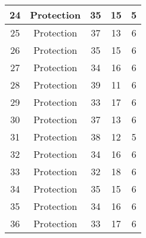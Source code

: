 \documentclass[results.tex]{subfiles}
\begin{document}
\begin{center}
\begin{tabular}{| c || c | c | c | c |}
            \hline
            24                      & Protection                   & 35                     & 15                      & 5                    \\
            \hline
            25                      & Protection                   & 37                     & 13                      & 6                    \\
            \hline
            26                      & Protection                   & 35                     & 15                      & 6                    \\
            \hline
            27                      & Protection                   & 34                     & 16                      & 6                    \\
            \hline
            28                      & Protection                   & 39                     & 11                      & 6                    \\
            \hline
            29                      & Protection                   & 33                     & 17                      & 6                    \\
            \hline
            30                      & Protection                   & 37                     & 13                      & 6                    \\
            \hline
            31                      & Protection                   & 38                     & 12                      & 5                    \\
            \hline
            32                      & Protection                   & 34                     & 16                      & 6                    \\
            \hline
            33                      & Protection                   & 32                     & 18                      & 6                    \\
            \hline
            34                      & Protection                   & 35                     & 15                      & 6                    \\
            \hline
            35                      & Protection                   & 34                     & 16                      & 6                    \\
            \hline
            36                      & Protection                   & 33                     & 17                      & 6                    \\

\end{tabular}
\end{center}
\end{document}

